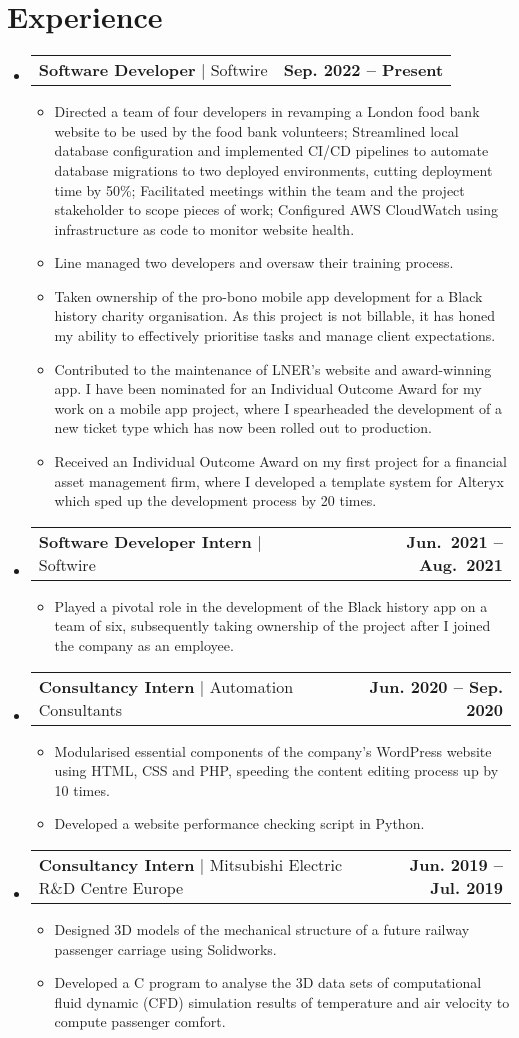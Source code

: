 \documentclass[letterpaper,10pt]{article}
\makeatletter
\newcommand{\resumeItem}[1]{
  \item\small{
    {#1 \vspace{-2pt}}
  }
}
\newcommand{\experienceItemHeading}[3]{
  \vspace{-2pt}
  \item
  \begin{tabular*}{0.97\textwidth}[t]{l@{\extracolsep{\fill}}r}
    \textbf{#1} $|$ #3 & \textbf{#2}
  \end{tabular*}\vspace{-7pt}
}
\newcommand{\resumeSubHeadingListStart}{\begin{itemize}[leftmargin=0.15in, label={}]}
\newcommand{\resumeSubHeadingListEnd}{\end{itemize}}
\newcommand{\resumeItemListStart}{\begin{itemize}}
\newcommand{\resumeItemListEnd}{\end{itemize}\vspace{-5pt}}
\makeatother
\begin{document}
\section{Experience}
  \resumeSubHeadingListStart
    \experienceItemHeading
      {Software Developer}
			{Sep. 2022 -- Present}
      {Softwire}
    \resumeItemListStart
      \resumeItem{Directed a team of four developers in revamping a London food bank website to be used by the food bank volunteers; Streamlined local database configuration and implemented CI/CD pipelines to automate database migrations to two deployed environments, cutting deployment time by 50\%; Facilitated meetings within the team and the project stakeholder to scope pieces of work; Configured AWS CloudWatch using infrastructure as code to monitor website health.}
      \resumeItem{Line managed two developers and oversaw their training process.}
			\resumeItem{Taken ownership of the pro-bono mobile app development for a Black history charity organisation. As this project is not billable, it has honed my ability to effectively prioritise tasks and manage client expectations.}
			\resumeItem{Contributed to the maintenance of LNER’s website and award-winning app. I have been nominated for an Individual Outcome Award for my work on a mobile app project, where I spearheaded the development of a new ticket type which has now been rolled out to production.}
      \resumeItem{Received an Individual Outcome Award on my first project for a financial asset management firm, where I developed a template system for Alteryx which sped up the development process by 20 times.}
    \resumeItemListEnd

    \experienceItemHeading
      {Software Developer Intern}
      {Jun.\ 2021 -- Aug.\ 2021}
      {Softwire}
    \resumeItemListStart
      \resumeItem{Played a pivotal role in the development of the Black history app on a team of six, subsequently taking
      ownership of the project after I joined the company as an employee.}
    \resumeItemListEnd

    \experienceItemHeading
      {Consultancy Intern}
			{Jun. 2020 -- Sep. 2020}
      {Automation Consultants}
    \resumeItemListStart
      \resumeItem{Modularised essential components of the company’s WordPress website using HTML, CSS and PHP,
      speeding the content editing process up by 10 times.}
      \resumeItem{Developed a website performance checking script in Python.}
    \resumeItemListEnd

    \experienceItemHeading
      {Consultancy Intern}
			{Jun. 2019 -- Jul. 2019}
      {Mitsubishi Electric R\&D Centre Europe}
    \resumeItemListStart
      \resumeItem{Designed 3D models of the mechanical structure of a future railway passenger carriage using
      Solidworks.}
      \resumeItem{Developed a C program to analyse the 3D data sets of computational fluid dynamic (CFD) simulation
      results of temperature and air velocity to compute passenger comfort.}
    \resumeItemListEnd
  \resumeSubHeadingListEnd
\end{document}
